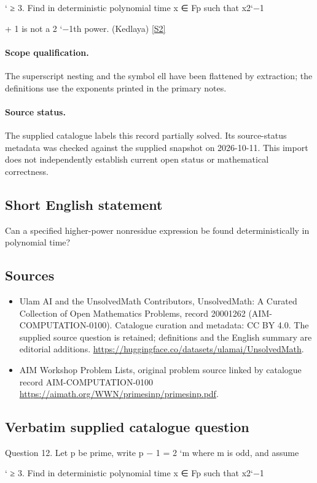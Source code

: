 \documentclass[11pt]{article}
\begin{document}
` ≥ 3. Find in deterministic polynomial time x ∈ Fp such that x2`−1

+ 1 is not a 2 `−1th power. (Kedlaya) \href{https://aimath.org/WWN/primesinp/primesinp.pdf}{[S2]}
\paragraph{Scope qualification.}
The superscript nesting and the symbol ell have been flattened by extraction; the definitions use the exponents printed in the primary notes.
\paragraph{Source status.}
The supplied catalogue labels this record partially solved. Its source-status metadata was checked against the supplied snapshot on 2026-10-11. This import does not independently establish current open status or mathematical correctness.
\subsection{Short English statement}
Can a specified higher-power nonresidue expression be found deterministically in polynomial time?
\subsection{Sources}
\begin{itemize}
\item[S1] Ulam AI and the UnsolvedMath Contributors, UnsolvedMath: A Curated Collection of Open Mathematics Problems, record 20001262 (AIM-COMPUTATION-0100). Catalogue curation and metadata: CC BY 4.0. The supplied source question is retained; definitions and the English summary are editorial additions.
\url{https://huggingface.co/datasets/ulamai/UnsolvedMath}.
\item[S2] AIM Workshop Problem Lists, original problem source linked by catalogue record AIM-COMPUTATION-0100
\url{https://aimath.org/WWN/primesinp/primesinp.pdf}.
\end{itemize}
\subsection{Verbatim supplied catalogue question}
Question 12. Let p be prime, write p − 1 = 2 `m where m is odd, and assume

` ≥ 3. Find in deterministic polynomial time x ∈ Fp such that x2`−1
\end{document}
